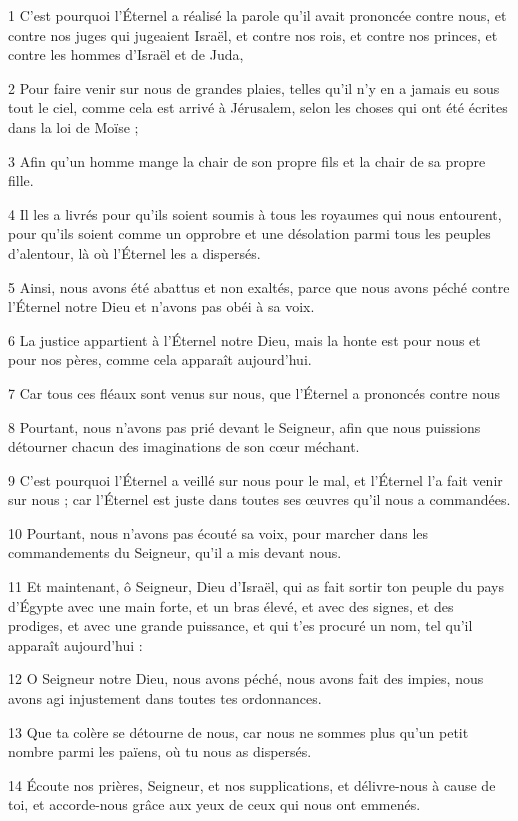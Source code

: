 \par 1 C'est pourquoi l'Éternel a réalisé la parole qu'il avait prononcée contre nous, et contre nos juges qui jugeaient Israël, et contre nos rois, et contre nos princes, et contre les hommes d'Israël et de Juda,
\par 2 Pour faire venir sur nous de grandes plaies, telles qu'il n'y en a jamais eu sous tout le ciel, comme cela est arrivé à Jérusalem, selon les choses qui ont été écrites dans la loi de Moïse ;
\par 3 Afin qu'un homme mange la chair de son propre fils et la chair de sa propre fille.
\par 4 Il les a livrés pour qu'ils soient soumis à tous les royaumes qui nous entourent, pour qu'ils soient comme un opprobre et une désolation parmi tous les peuples d'alentour, là où l'Éternel les a dispersés.
\par 5 Ainsi, nous avons été abattus et non exaltés, parce que nous avons péché contre l'Éternel notre Dieu et n'avons pas obéi à sa voix.
\par 6 La justice appartient à l'Éternel notre Dieu, mais la honte est pour nous et pour nos pères, comme cela apparaît aujourd'hui.
\par 7 Car tous ces fléaux sont venus sur nous, que l'Éternel a prononcés contre nous
\par 8 Pourtant, nous n'avons pas prié devant le Seigneur, afin que nous puissions détourner chacun des imaginations de son cœur méchant.
\par 9 C'est pourquoi l'Éternel a veillé sur nous pour le mal, et l'Éternel l'a fait venir sur nous ; car l'Éternel est juste dans toutes ses œuvres qu'il nous a commandées.
\par 10 Pourtant, nous n'avons pas écouté sa voix, pour marcher dans les commandements du Seigneur, qu'il a mis devant nous.
\par 11 Et maintenant, ô Seigneur, Dieu d'Israël, qui as fait sortir ton peuple du pays d'Égypte avec une main forte, et un bras élevé, et avec des signes, et des prodiges, et avec une grande puissance, et qui t'es procuré un nom, tel qu'il apparaît aujourd'hui :
\par 12 O Seigneur notre Dieu, nous avons péché, nous avons fait des impies, nous avons agi injustement dans toutes tes ordonnances.
\par 13 Que ta colère se détourne de nous, car nous ne sommes plus qu'un petit nombre parmi les païens, où tu nous as dispersés.
\par 14 Écoute nos prières, Seigneur, et nos supplications, et délivre-nous à cause de toi, et accorde-nous grâce aux yeux de ceux qui nous ont emmenés.
